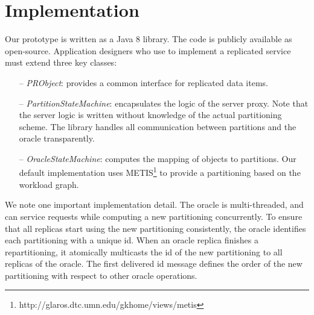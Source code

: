 \section{Implementation}
\label{sec:implementation}


Our  \dynastar prototype is written as a
Java 8 library.
The code is publicly available as open-source.
Application designers who use \dynastar
 to implement a replicated service must extend three key classes:
 \begin{itemize}
 \item[--] \emph{PRObject}: provides a common interface for replicated data items.
 \item[--] \emph{PartitionStateMachine}: encapsulates the logic of the server
   proxy. Note that the server logic is written without knowledge of the actual partitioning scheme. The \dynastar library
   handles all communication between partitions and the oracle transparently.
 \item[--] \emph{OracleStateMachine}: computes the mapping of objects to partitions.
Our default implementation uses METIS\footnote{http://glaros.dtc.umn.edu/gkhome/views/metis} to provide a partitioning based on the workload graph.
 \end{itemize}

 We note one important implementation detail.  The oracle is
 multi-threaded, and can service requests while computing a new
 partitioning concurrently. To ensure that all replicas start using
 the new partitioning consistently, the oracle identifies each
 partitioning with a unique id.  When an oracle replica finishes a
 repartitioning, it atomically multicasts the id of the new
 partitioning to all replicas of the oracle.  The first delivered id
 message defines the order of the new partitioning with respect to
 other oracle operations.




